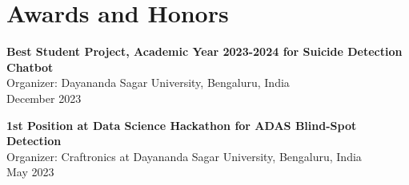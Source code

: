 \documentclass[a4paper,10pt]{article}
\begin{document}
\section*{Awards and Honors}
\vspace{1mm}
\textbf{Best Student Project, Academic Year 2023-2024 for Suicide Detection Chatbot} \\
Organizer: Dayananda Sagar University, Bengaluru, India \\
December 2023 

\textbf{1st Position at Data Science Hackathon for ADAS Blind-Spot Detection} \\
Organizer: Craftronics at Dayananda Sagar University, Bengaluru, India \\
May 2023 \\

\end{document}
